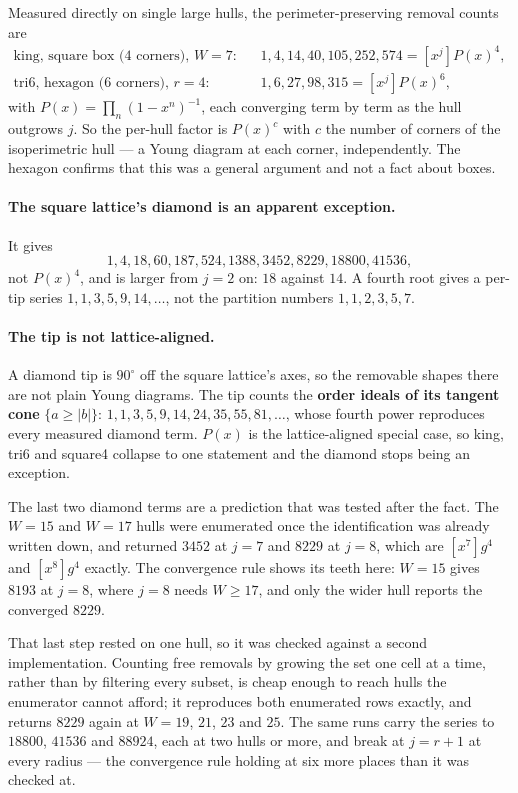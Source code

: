 \documentclass[11pt]{article}
\begin{document}
Measured directly on single large hulls, the perimeter-preserving removal counts
are
\[
\begin{aligned}
  \text{king, square box (4 corners), } W{=}7:&\quad 1, 4, 14, 40, 105, 252, 574 = [x^j]P(x)^4, \\
  \text{tri6, hexagon (6 corners), } r{=}4:&\quad 1, 6, 27, 98, 315 = [x^j]P(x)^6,
\end{aligned}
\]
with $P(x) = \prod_n (1-x^n)^{-1}$, each converging term by term as the hull
outgrows $j$. So the per-hull factor is $P(x)^c$ with $c$ the number of corners
of the isoperimetric hull --- a Young diagram at each corner, independently. The
hexagon confirms that this was a general argument and not a fact about boxes.

\paragraph{The square lattice's diamond is an apparent exception.} It gives
\[
  1, 4, 18, 60, 187, 524, 1388, 3452, 8229, 18800, 41536 ,
\]
not $P(x)^4$, and is larger from $j = 2$ on: $18$ against $14$. A fourth root gives a per-tip series
$1, 1, 3, 5, 9, 14, \dots$, not the partition numbers $1, 1, 2, 3, 5, 7$.

\paragraph{The tip is not lattice-aligned.} A diamond tip is $90^\circ$ off the square lattice's axes,
so the removable shapes there are not plain Young diagrams. The tip counts
the \textbf{order ideals of its tangent cone} $\{a \ge |b|\}$:
$1, 1, 3, 5, 9, 14, 24, 35, 55, 81, \dots$, whose fourth power reproduces every
measured diamond term. $P(x)$ is the lattice-aligned special case, so king, tri6
and square4 collapse to one statement and the diamond stops being an exception.

The last two diamond terms are a prediction that was tested after the fact. The
$W = 15$ and $W = 17$ hulls were enumerated once the identification was already
written down, and returned $3452$ at $j = 7$ and $8229$ at $j = 8$, which are
$[x^7]g^4$ and $[x^8]g^4$ exactly. The convergence rule shows its teeth here:
$W = 15$ gives $8193$ at $j = 8$, where $j = 8$ needs $W \ge 17$, and only the
wider hull reports the converged $8229$.

That last step rested on one hull, so it was checked against a second
implementation. Counting free removals by growing the set one cell at a time,
rather than by filtering every subset, is cheap enough to reach hulls the
enumerator cannot afford; it reproduces both enumerated rows exactly, and
returns $8229$ again at $W = 19$, $21$, $23$ and $25$. The same runs carry the
series to $18800$, $41536$ and $88924$, each at two hulls or more, and break at
$j = r+1$ at every radius --- the convergence rule holding at six more places
than it was checked at.
\end{document}
